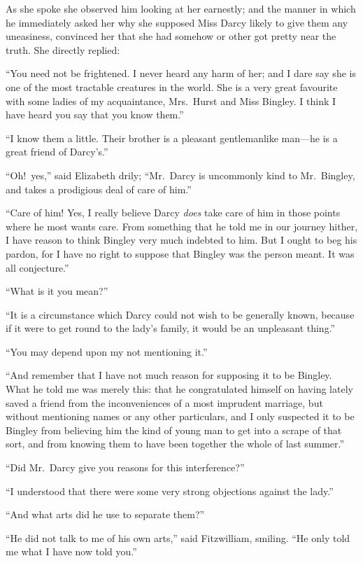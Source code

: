 \documentclass[12pt,english]{book}
\begin{document}
As she spoke she observed him looking at her earnestly; and the manner
in which he immediately asked her why she supposed Miss Darcy likely
to give them any uneasiness, convinced her that she had somehow or
other got pretty near the truth. She directly replied:

{}``You need not be frightened. I never heard any harm of her; and
I dare say she is one of the most tractable creatures in the world.
She is a very great favourite with some ladies of my acquaintance,
Mrs.\ Hurst and Miss Bingley. I think I have heard you say that you
know them.''

{}``I know them a little. Their brother is a pleasant gentlemanlike
man\mbox{---}he is a great friend of Darcy's.''

{}``Oh!\ yes,'' said Elizabeth drily; {}``Mr.\ Darcy is uncommonly
kind to Mr.\ Bingley, and takes a prodigious deal of care of him.''

{}``Care of him! Yes, I really believe Darcy \textit{does} take care
of him in those points where he most wants care. From something that
he told me in our journey hither, I have reason to think Bingley very
much indebted to him. But I ought to beg his pardon, for I have no
right to suppose that Bingley was the person meant. It was all conjecture.''

{}``What is it you mean?''\ 

{}``It is a circumstance which Darcy could not wish to be generally
known, because if it were to get round to the lady's family, it would
be an unpleasant thing.''

{}``You may depend upon my not mentioning it.''

{}``And remember that I have not much reason for supposing it to
be Bingley. What he told me was merely this: that he congratulated
himself on having lately saved a friend from the inconveniences of
a most imprudent marriage, but without mentioning names or any other
particulars, and I only suspected it to be Bingley from believing
him the kind of young man to get into a scrape of that sort, and from
knowing them to have been together the whole of last summer.''

{}``Did Mr.\ Darcy give you reasons for this interference?''\ 

{}``I understood that there were some very strong objections against
the lady.''

{}``And what arts did he use to separate them?''\ 

{}``He did not talk to me of his own arts,'' said Fitzwilliam, smiling.
{}``He only told me what I have now told you.''
\end{document}
